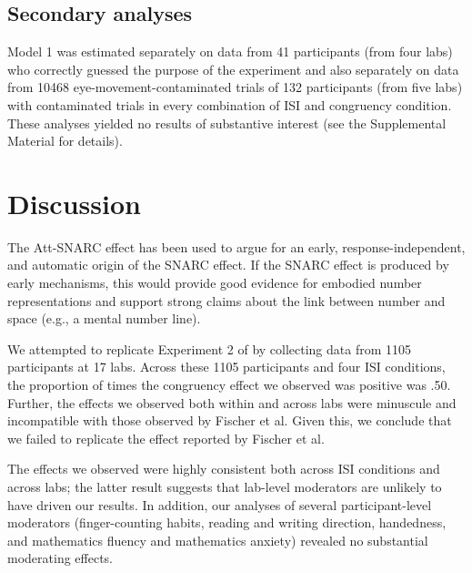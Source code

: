 \documentclass[man,floatsintext]{apa6}
\theoremstyle{definition}
\theoremstyle{definition}
\theoremstyle{definition}
\theoremstyle{remark}
\begin{document}
\subsection{Secondary analyses}\label{secondary-analyses-1}

Model 1 was estimated separately on data from 41 participants (from four
labs) who correctly guessed the purpose of the experiment and also
separately on data from 10468 eye-movement-contaminated trials of 132
participants (from five labs) with contaminated trials in every
combination of ISI and congruency condition. These analyses yielded no
results of substantive interest (see the Supplemental Material for
details).

\section{Discussion}\label{discussion}

The Att-SNARC effect has been used to argue for an early,
response-independent, and automatic origin of the SNARC effect. If the
SNARC effect is produced by early mechanisms, this would provide good
evidence for embodied number representations and support strong claims
about the link between number and space (e.g., a mental number line).

We attempted to replicate Experiment 2 of \textcite{Fischer:2003ju} by
collecting data from 1105 participants at 17 labs. Across these 1105
participants and four ISI conditions, the proportion of times the
congruency effect we observed was positive was .50. Further, the effects
we observed both within and across labs were minuscule and incompatible
with those observed by Fischer et al. Given this, we conclude that we
failed to replicate the effect reported by Fischer et al.

The effects we observed were highly consistent both across ISI
conditions and across labs; the latter result suggests that lab-level
moderators are unlikely to have driven our results. In addition, our
analyses of several participant-level moderators (finger-counting
habits, reading and writing direction, handedness, and mathematics
fluency and mathematics anxiety) revealed no substantial moderating
effects.
\end{document}
